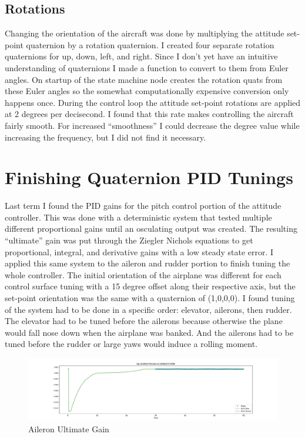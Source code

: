 \documentclass[11pt]{scrartcl} %
\begin{document}
\subsection{Rotations}
Changing the orientation of the aircraft was done by multiplying the attitude set-point quaternion by a rotation quaternion. I created four separate rotation quaternions for up, down, left, and right. Since I don’t yet have an intuitive understanding of quaternions I made a function to convert to them from Euler angles. On startup of the state machine node creates the rotation quats from these Euler angles so the somewhat computationally expensive conversion only happens once. During the control loop the attitude set-point rotations are applied at 2 degrees per decisecond. I found that this rate makes controlling the aircraft fairly smooth. For increased “smoothness” I could decrease the degree value while increasing the frequency, but I did not find it necessary. 


\section{Finishing Quaternion PID Tunings}
Last term I found the PID gains for the pitch control portion of the attitude controller. This was done with a deterministic system that tested multiple different proportional gains until an osculating output was created. The resulting “ultimate” gain was put through the Ziegler Nichols equations to get proportional, integral, and derivative gains with a low steady state error. I applied this same system to the aileron and rudder portion to finish tuning the whole controller. The initial orientation of the airplane was different for each control surface tuning with a 15 degree offset along their respective axis, but the set-point orientation was the same with a quaternion of (1,0,0,0). I found tuning of the system had to be done in a specific order: elevator, ailerons, then rudder. The elevator had to be tuned before the ailerons because otherwise the plane would fall nose down when the airplane was banked. And the ailerons had to be tuned before the rudder or large yaws would induce a rolling moment.


\begin{figure}[ht!] %
	\centering
	\includegraphics[trim={5cm 0 5cm 0},clip,width=\textwidth]{figures/aeleronTestGain.pdf} 
	\caption{Aileron Ultimate Gain}
\end{figure}
\end{document}
